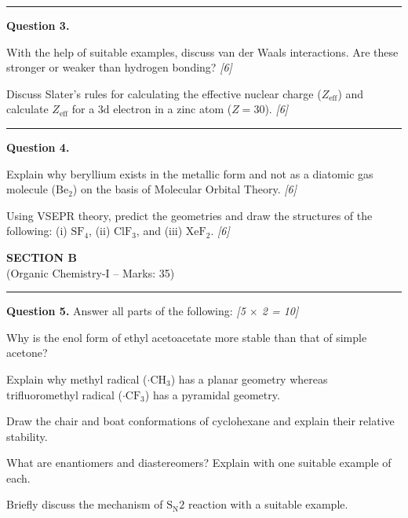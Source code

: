 \documentclass[11pt,a4paper]{article}
\newcommand{\pts}[1]{\hfill   \textit{[#1]}}
\begin{document}
\medskip\rule{\linewidth}{0.2pt}




\noindent   \textbf{Question 3.}

\begin{parts}
  \item With the help of suitable examples, discuss van der Waals interactions. Are these stronger or weaker than hydrogen bonding? \pts{6}
  \item Discuss Slater's rules for calculating the effective nuclear charge ($Z_{ \text{eff}}$) and calculate $Z_{ \text{eff}}$ for a $3 \text{d}$ electron in a zinc atom ($Z = 30$). \pts{6}
\end{parts}

\medskip\rule{\linewidth}{0.2pt}




\noindent   \textbf{Question 4.}

\begin{parts}
  \item Explain why beryllium exists in the metallic form and not as a diatomic gas molecule ($ \text{Be}_2$) on the basis of Molecular Orbital Theory. \pts{6}
  \item Using VSEPR theory, predict the geometries and draw the structures of the following: (i) $ \text{SF}_4$, (ii) $ \text{ClF}_3$, and (iii) $ \text{XeF}_2$. \pts{6}
\end{parts}


\newpage

\begin{center}
  {\large\bfseries SECTION B}\\[2pt]
  {\normalsize (Organic Chemistry-I -- Marks: 35)}
\end{center}
\rule{0.4\linewidth}{0.2pt}
\smallskip




\noindent   \textbf{Question 5.} Answer all parts of the following: \pts{5 $ \times$ 2 = 10}

\begin{parts}
  \item Why is the enol form of ethyl acetoacetate more stable than that of simple acetone?
  \item Explain why methyl radical ($\cdot \text{CH}_3$) has a planar geometry whereas trifluoromethyl radical ($\cdot \text{CF}_3$) has a pyramidal geometry.
  \item Draw the chair and boat conformations of cyclohexane and explain their relative stability.
  \item What are enantiomers and diastereomers? Explain with one suitable example of each.
  \item Briefly discuss the mechanism of $ \text{S}_{ \text{N}}2$ reaction with a suitable example.
\end{parts}
\end{document}
